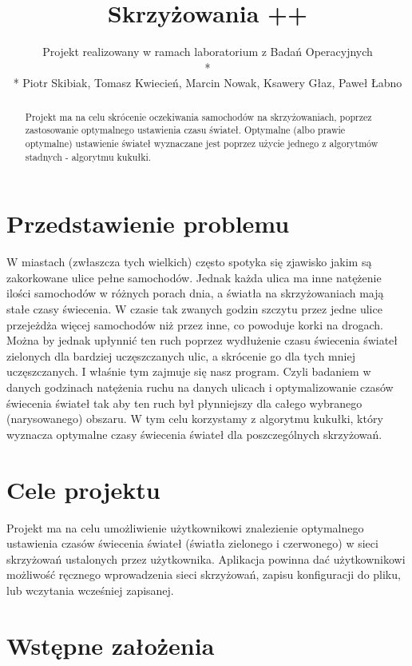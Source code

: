 \documentclass{article}
\title {Skrzyżowania ++}
\author{Projekt realizowany w ramach laboratorium z Badań Operacyjnych \\* \\* Piotr Skibiak, Tomasz Kwiecień, Marcin Nowak, Ksawery Głaz, Paweł Łabno}
\institute{AGH, Wydział IEiT, Informatyka, rok 2014}
\begin{document}
\maketitle

\begin{abstract}
Projekt ma na celu skrócenie oczekiwania samochodów na skrzyżowaniach, poprzez zastosowanie optymalnego ustawienia czasu świateł. Optymalne (albo prawie optymalne) ustawienie świateł wyznaczane jest poprzez użycie jednego z algorytmów stadnych - algorytmu kukułki.   
\end{abstract}

\newpage
\renewcommand*\contentsname{Spis Treści}
\tableofcontents
\setcounter{tocdepth}{3}

\newpage

\section{Przedstawienie problemu}
    W miastach (zwłaszcza tych wielkich) często spotyka się zjawisko jakim są zakorkowane ulice pełne samochodów. Jednak każda ulica ma inne natężenie ilości samochodów w różnych porach dnia, a światła na skrzyżowaniach mają stałe czasy świecenia. W czasie tak zwanych godzin szczytu przez jedne ulice przejeżdża więcej samochodów niż przez inne, co powoduje korki na drogach. Można by jednak upłynnić ten ruch poprzez wydłużenie czasu świecenia świateł zielonych dla bardziej uczęszczanych ulic, a skrócenie go dla tych mniej uczęszczanych. I właśnie tym zajmuje się nasz program. Czyli badaniem w danych godzinach natężenia ruchu na danych ulicach i optymalizowanie czasów świecenia świateł tak aby ten ruch był płynniejszy dla całego wybranego (narysowanego) obszaru. W tym celu korzystamy z algorytmu kukułki, który wyznacza optymalne czasy świecenia świateł dla poszczególnych skrzyżowań.


\section{Cele projektu}
    Projekt ma na celu umożliwienie użytkownikowi znalezienie optymalnego ustawienia czasów świecenia świateł (światła zielonego i czerwonego) w sieci skrzyżowań ustalonych przez użytkownika. Aplikacja powinna dać użytkownikowi możliwość ręcznego wprowadzenia sieci skrzyżowań, zapisu konfiguracji do pliku, lub wczytania wcześniej zapisanej. 

\section{Wstępne założenia}
\end{document}
